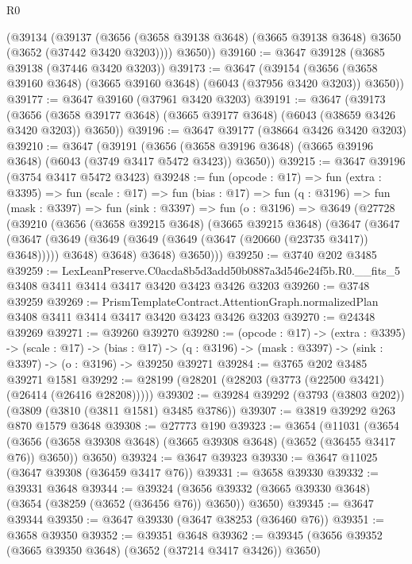 \begin{lexlean}{R0}
\begin{coremodule}
      (@39134
        (@39137
          (@3656 (@3658 @39138 @3648) (@3665 @39138 @3648) @3650 (@3652 (@37442 @3420 @3203))))
        @3650))
@39160 := @3647 @39128 (@3685 @39138 (@37446 @3420 @3203))
@39173 := @3647
    (@39154 (@3656 (@3658 @39160 @3648) (@3665 @39160 @3648) (@6043 (@37956 @3420 @3203)) @3650))
@39177 := @3647 @39160 (@37961 @3420 @3203)
@39191 := @3647
    (@39173
      (@3656 (@3658 @39177 @3648) (@3665 @39177 @3648) (@6043 (@38659 @3426 @3420 @3203)) @3650))
@39196 := @3647 @39177 (@38664 @3426 @3420 @3203)
@39210 := @3647
    (@39191
      (@3656 (@3658 @39196 @3648) (@3665 @39196 @3648) (@6043 (@3749 @3417 @5472 @3423)) @3650))
@39215 := @3647 @39196 (@3754 @3417 @5472 @3423)
@39248 := fun (opcode : @17) =>
  fun (extra : @3395) =>
  fun (scale : @17) =>
  fun (bias : @17) =>
  fun (q : @3196) =>
  fun (mask : @3397) =>
  fun (sink : @3397) =>
  fun (o : @3196) =>
  @3649
    (@27728
      (@39210
        (@3656
          (@3658 @39215 @3648)
          (@3665 @39215 @3648)
          (@3647
            (@3647
              (@3647 (@3649 (@3649 (@3649 (@3649 (@3647 (@20660 (@23735 @3417)) @3648))))) @3648)
              @3648)
            @3648)
          @3650)))
@39250 := @3740 @202 @3485
@39259 := LexLeanPreserve.C0acda8b5d3add50b0887a3d546e24f5b.R0.__fits_5
    @3408
    @3411
    @3414
    @3417
    @3420
    @3423
    @3426
    @3203
@39260 := @3748 @39259
@39269 := PrismTemplateContract.AttentionGraph.normalizedPlan
    @3408
    @3411
    @3414
    @3417
    @3420
    @3423
    @3426
    @3203
@39270 := @24348 @39269
@39271 := @39260 @39270
@39280 := (opcode : @17) ->
  (extra : @3395) ->
  (scale : @17) ->
  (bias : @17) -> (q : @3196) -> (mask : @3397) -> (sink : @3397) -> (o : @3196) -> @39250 @39271
@39284 := @3765 @202 @3485 @39271 @1581
@39292 := @28199 (@28201 (@28203 (@3773 (@22500 @3421) (@26414 (@26416 @28208)))))
@39302 := @39284 @39292 (@3793 (@3803 @202)) (@3809 (@3810 (@3811 @1581) @3485 @3786))
@39307 := @3819 @39292 @263 @870 @1579 @3648
@39308 := @27773 @190
@39323 := @3654
    (@11031
      (@3654 (@3656 (@3658 @39308 @3648) (@3665 @39308 @3648) (@3652 (@36455 @3417 @76)) @3650))
      @3650)
@39324 := @3647 @39323
@39330 := @3647 @11025 (@3647 @39308 (@36459 @3417 @76))
@39331 := @3658 @39330
@39332 := @39331 @3648
@39344 := @39324
    (@3656 @39332 (@3665 @39330 @3648) (@3654 (@38259 (@3652 (@36456 @76)) @3650)) @3650)
@39345 := @3647 @39344
@39350 := @3647 @39330 (@3647 @38253 (@36460 @76))
@39351 := @3658 @39350
@39352 := @39351 @3648
@39362 := @39345 (@3656 @39352 (@3665 @39350 @3648) (@3652 (@37214 @3417 @3426)) @3650)

\end{coremodule}
\end{lexlean}
